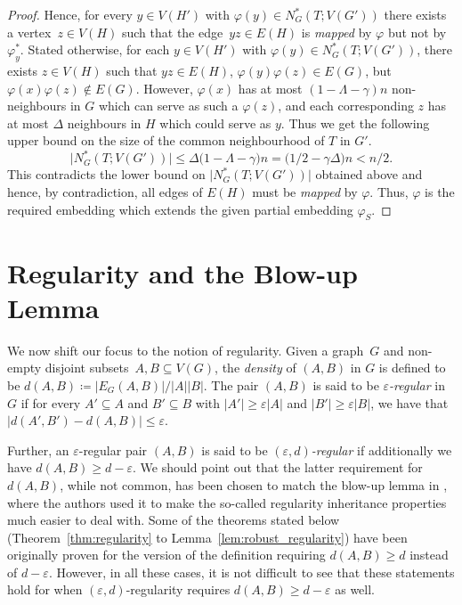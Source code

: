 \documentclass[final]{article}
\theoremstyle{definition}
\newcommand{\eps}{\varepsilon}
\begin{document}
\begin{proof}
    Hence, for every $y \in V(H')$ with $\varphi(y) \in N^*_G(T; V(G'))$ there exists a vertex~$z \in V(H)$ such that the edge~$yz \in E(H)$ is \emph{mapped} by $\varphi$ but not by $\varphi_y^*$.
    Stated otherwise, for each $y \in V(H')$ with $\varphi(y) \in N^*_G(T; V(G'))$, there exists $z \in V(H)$ such that $yz \in E(H)$, $\varphi(y)\varphi(z) \in E(G)$, but $\varphi(x)\varphi(z) \notin E(G)$. 
    However, $\varphi(x)$ has at most $(1 - \Lambda - \gamma)n$ non-neighbours in $G$ which can serve as such a $\varphi(z)$, 
    and each corresponding $z$ has at most $\Delta$ neighbours in $H$ which could serve as $y$. Thus we get the following upper bound on the size of the common neighbourhood of $T$ in $G'$.
    $$\bigl|N^*_G(T; V(G'))\bigr| \leq \Delta \bigl(1 - \Lambda - \gamma\bigr)n = \bigl(1/2 - \gamma \Delta\bigr)n < n/2.$$
    This contradicts the lower bound on $\bigl|N^*_G(T; V(G'))\bigr|$ obtained above and hence, by contradiction, all edges of $E(H)$ must be \emph{mapped} by $\varphi$. 
    Thus, $\varphi$ is the required embedding which extends the given partial embedding $\varphi_S$.
\end{proof}

\section{Regularity and the Blow-up Lemma}
\label{sec:Regularity_dense_SBL}

We now shift our focus to the notion of regularity. Given a graph~$G$ and non-empty disjoint subsets~$A, B \subseteq V(G)$, the \emph{density} of $(A,B)$ in $G$ is defined to be $d(A,B)\coloneqq |E_G(A,B)|/{|A||B|}$. The pair $(A,B)$ is said to be \emph{$\eps$-regular} in $G$ if for every $A'\subseteq A$ and $B'\subseteq B$ with $|A'| \geq \eps|A|$ and $|B'| \geq \eps|B|$, we have that $|d(A',B') - d(A,B)| \leq \eps$. 

Further, an $\eps$-regular pair $(A,B)$ is said to be \emph{$(\eps, d)$-regular} if additionally we have $d(A,B) \geq d-\eps$. We should point out that the latter requirement for $d(A,B)$, while not common, has been chosen to match the blow-up lemma in \cite{sparse_blowup}, where the authors used it to make the so-called regularity inheritance properties much easier to deal with. Some of the theorems stated below (Theorem~\ref{thm:regularity} to Lemma~\ref{lem:robust_regularity}) have been originally proven for the version of the definition requiring $d(A,B) \geq d$ instead of $d-\eps$. However, in all these cases, it is not difficult to see that these statements hold for when $(\eps,d)$-regularity requires $d(A,B) \geq d - \eps$ as well. 
\end{document}
